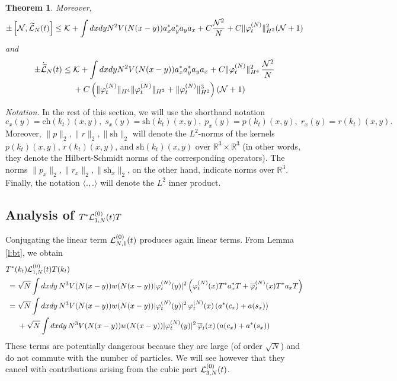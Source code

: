\documentclass[11pt,a4paper,DIV11]{scrartcl}	%
\newtheorem{theorem}{Theorem}[section]
\newcommand{\bR}{{\mathbb R}}
\newcommand{\wt}{\widetilde}
\newcommand{\cK}{{\cal K}}
\newcommand{\cL}{{\cal L}}
\newcommand{\cN}{{\cal N}}
\begin{document}
\begin{theorem}
Moreover, 
\begin{equation}\label{eq:thmL-2} \pm \left[ \cN , \wt{\cL}_N (t) \right]  \leq \cK  + \int dx dy N^2 V(N (x-y)) a_x^* a_y^* a_y a_x   + C \frac{\cN^2}{N} + C \| \varphi_t^{(N)} \|_{H^2}^2 (\cN+1) \end{equation}
and 
\begin{equation}\label{eq:thmL-3}
\begin{split} 
\pm \dot{\wt{\cL}}_N (t)  \leq \; &\cK + \int dx dy N^2 V(N (x-y)) a_x^* a_y^* a_y a_x  + C \| \varphi_t^{(N)} \|_{H^4}^2 \, \frac{\cN^2}{N}  \\ &+ C \left( \| \varphi_t^{(N)} \|_{H^4}  \| \varphi_t^{(N)} \|_{H^2} + \| \varphi_t^{(N)} \|_{H^2}^3 \right) \left(\cN+1 \right)  
\end{split}
\end{equation}
\end{theorem}

\bigskip

{\it Notation.} In the rest of this section, we will use the shorthand notation \begin{equation}\label{eq:def-csprx} 
c_x (y) = \text{ch} (k_t) (x,y), \;  s_x (y) = \text{sh} (k_t) (x,y), \; p_x (y) = p (k_t) (x,y), \; 
r_x (y) = r (k_t) (x,y). \end{equation}
Moreover, $\| p \|_2 , \| r \|_2, \|\text{sh} \|_2$ will denote the $L^2$-norms of the kernels $p (k_t) (x,y)$, $r (k_t) (x,y)$, and $\text{sh} (k_t) (x,y)$ over $\bR^3 \times \bR^3$ (in other words, they denote the Hilbert-Schmidt norms of the corresponding operators). The norms $\| p_x \|_2, \| r_x \|_2, \| \text{sh}_x \|_2$, on the other hand, indicate norms over $\bR^3$. Finally, the notation $\langle . , . \rangle$ will denote the $L^2$ inner product. 


\subsection{Analysis of $T^* \cL^{(0)}_{1,N} (t) T$}

Conjugating the linear term $\cL^{(0)}_{N,1} (t)$ produces again linear terms. {F}rom Lemma \ref{l:bt}, we obtain
\begin{equation}\label{eq:TL1T} \begin{split} T^* (&k_t)  \cL^{(0)}_{1,N} (t) T (k_t) \\ = \; & \sqrt{N} \int dx dy \, N^3 V (N (x-y)) w (N (x-y)) |\varphi_t^{(N)} (y)|^2 \left( \varphi^{(N)}_t (x) T^* a^*_x T + \overline{\varphi}_t^{(N)} (x) T^* a_x T \right) \\ 
= \; &\sqrt{N} \int dx dy \, N^3 V (N (x-y)) w (N (x-y)) |\varphi_t^{(N)} (y)|^2 \, \varphi^{(N)}_t (x)  \, ( a^*(c_x) + a(s_x)) \\ &+ \sqrt{N} \int dx dy \, N^3 V (N (x-y)) w (N (x-y)) |\varphi_t^{(N)} (y)|^2 \, \overline{\varphi}_t (x)  \, ( a (c_x) + a^* (s_x)) \end{split} \end{equation}
These terms are potentially dangerous because they are large (of order $\sqrt{N}$) and do not commute with the number of particles. We will see however that they cancel with contributions arising from the cubic part $\cL_{3,N}^{(0)} (t)$. 
\end{document}
